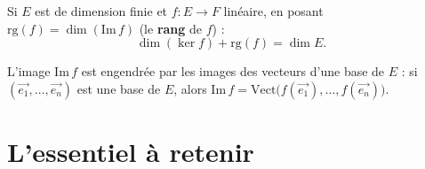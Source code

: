 \begin{propriete}
Si $E$ est de dimension finie et $f:E\to F$ linéaire, en posant
$\mathrm{rg}(f)=\dim(\mathrm{Im}\,f)$ (le \textbf{rang} de $f$) :
\[
\dim(\ker f)+\mathrm{rg}(f)=\dim E.
\]
\end{propriete}

\begin{remarque}
L'image $\mathrm{Im}\,f$ est engendrée par les images des vecteurs d'une base de $E$ : si
$(\vec{e_1},\dots,\vec{e_n})$ est une base de $E$, alors
$\mathrm{Im}\,f=\mathrm{Vect}\big(f(\vec{e_1}),\dots,f(\vec{e_n})\big)$.
\end{remarque}

\section{L'essentiel à retenir}

